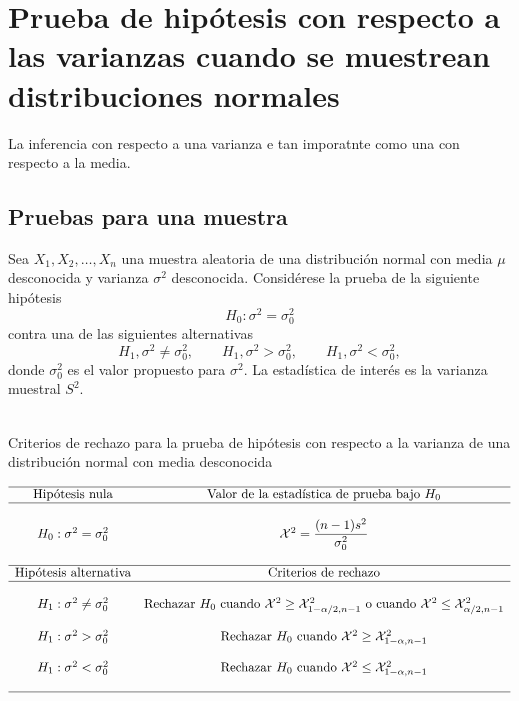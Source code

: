 \section{Prueba de hipótesis con respecto a las varianzas cuando se muestrean distribuciones normales}
La inferencia con respecto a una varianza e tan imporatnte como una con respecto a la media. 

\subsection{Pruebas para una muestra}
Sea $X_1,X_2,\ldots,X_n$ una muestra aleatoria de una distribución normal con media $\mu$ desconocida y varianza $\sigma^2$ desconocida. Considérese la prueba de la siguiente hipótesis
$$H_0:\sigma^2=\sigma^2_0$$
contra una de las siguientes alternativas
$$H_1,\sigma^2\neq \sigma^2_0,\qquad H_1,\sigma^2>\sigma^2_0,\qquad H_1,\sigma^2<\sigma^2_0,$$
donde $\sigma_0^2$ es el valor propuesto para $\sigma^2$. La estadística de interés es la varianza muestral $S^2$. \\\\

\begin{center}
    Criterios de rechazo para la prueba de hipótesis con respecto a la varianza de una distribución normal con media desconocida
\end{center}
$$
\begin{array}{cc}
    \hline
    \mbox{Hipótesis nula} & \mbox{Valor de la estadística de prueba bajo } H_0\\
    \hline\\
    H_0: \sigma^2=\sigma_0^2 & \mathcal{X}^2=\dfrac{(n-1)s^2}{\sigma_0^2}\\\\
    \hline
    \mbox{Hipótesis alternativa} & \mbox{Criterios de rechazo}\\
    \hline\\
    H_1:\sigma^2\neq \sigma_0^2 & \mbox{Rechazar } H_0 \mbox{ cuando } \mathcal{X}^2\geq\mathcal{X}^2_{1-\alpha/2,n-1} \mbox{ o cuando } \mathcal{X}^2\leq \mathcal{X}^2_{\alpha/2,n-1}\\\\
    H_1:\sigma^2>\sigma_0^2 & \mbox{Rechazar } H_0 \mbox{ cuando } \mathcal{X}^2\geq\mathcal{X}^2_{1-\alpha,n-1}\\\\
    H_1:\sigma^2<\sigma_0^2 & \mbox{Rechazar } H_0 \mbox{ cuando } \mathcal{X}^2\leq\mathcal{X}^2_{1-\alpha,n-1}\\\\
    \hline
\end{array}
$$

